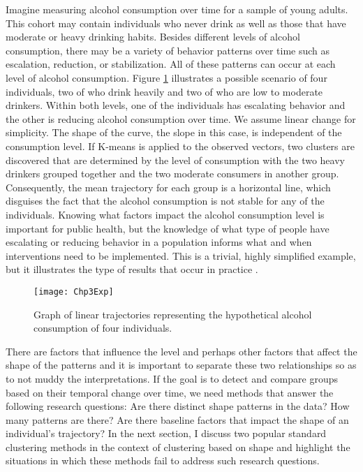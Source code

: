 Imagine measuring alcohol consumption over time for a sample of young adults. This cohort may contain individuals who never drink as well as those that have moderate or heavy drinking habits. Besides different levels of alcohol consumption, there may be a variety of behavior patterns over time such as escalation, reduction, or stabilization. All of these patterns can occur at each level of alcohol consumption. Figure \ref{fig:3-1} illustrates a possible scenario of four individuals, two of who drink heavily and two of who are low to moderate drinkers. Within both levels, one of the individuals has escalating behavior and the other is reducing alcohol consumption over time. We assume linear change for simplicity. The shape of the curve, the slope in this case, is independent of the consumption level. If K-means is applied to the observed vectors, two clusters are discovered that are determined by the level of consumption with the two heavy drinkers grouped together and the two moderate consumers in another group. Consequently, the mean trajectory for each group is a horizontal line, which disguises the fact that the alcohol consumption is not stable for any of the individuals. Knowing what factors impact the alcohol consumption level is important for public health, but the knowledge of what type of people have escalating or reducing behavior in a population informs what and when interventions need to be implemented. This is a trivial, highly simplified example, but it illustrates the type of results that occur in practice \cite{mccoy2010}.

\begin{figure}[ht]
\centering
\texttt{[image: Chp3Exp]}
\caption{Graph of linear trajectories representing the hypothetical alcohol consumption of four individuals.}
\label{fig:3-1}
\end{figure}

There are factors that influence the level and perhaps other factors that affect the shape of the patterns and it is important to separate these two relationships so as to not muddy the interpretations. If the goal is to detect and compare groups based on their temporal change over time, we need methods that answer the following research questions: Are there distinct shape patterns in the data? How many patterns are there? Are there baseline factors that impact the shape of an individual's trajectory? In the next section, I discuss two popular standard clustering methods in the context of clustering based on shape and highlight the situations in which these methods fail to address such research questions. 

